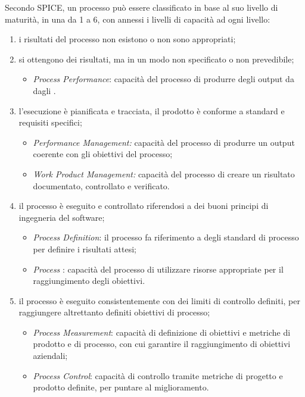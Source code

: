 Secondo SPICE, un processo può essere classificato in base al suo livello di maturità, in una  da 1 a 6, con annessi i livelli di capacità ad ogni livello:
\begin{enumerate}
\setcounter{enumi}{0}
\item {} i risultati del processo non esistono o non sono appropriati;
\item {} si ottengono dei risultati, ma in un modo non specificato o non prevedibile;
\begin{itemize}
\item \emph{Process Performance}: capacità del processo di produrre degli output da dagli .
\end{itemize}
\item  {} l'esecuzione è pianificata e tracciata, il prodotto è conforme a standard e requisiti specifici;
\begin{itemize}
\item \emph{Performance Management:} capacità del processo di produrre un output coerente con gli obiettivi del processo;
\item \emph{Work Product Management:} capacità del processo di creare un risultato documentato, controllato e verificato.
\end{itemize}
\item  {} il processo è eseguito e controllato riferendosi a dei buoni principi di ingegneria del software;
\begin{itemize}
\item \emph{Process Definition}: il processo fa riferimento a degli standard di processo per definire i risultati attesi;
\item \emph{Process }: capacità del processo di utilizzare risorse appropriate per il raggiungimento degli obiettivi.
\end{itemize}
\item  {} il processo è eseguito consistentemente con dei limiti di controllo definiti, per raggiungere altrettanto definiti obiettivi di processo;
\begin{itemize}
\item \emph{Process Measurement}: capacità di definizione di obiettivi e metriche di prodotto e di processo, con cui garantire il raggiungimento di obiettivi aziendali;
\item \emph{Process Control}: capacità di controllo tramite metriche di progetto e prodotto definite, per puntare al miglioramento.

\end{itemize}
\end{enumerate}
